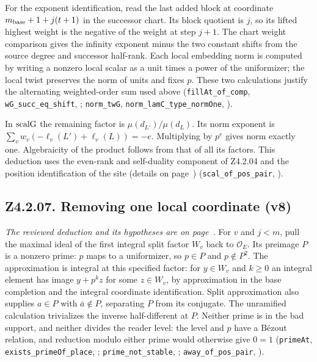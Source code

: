For the exponent identification, read the last added block at coordinate \(m_{\rm base}+1+j(t+1)\) in the successor chart. Its block quotient is \(j\), so its lifted highest weight is the negative of the weight at step \(j+1\). The chart weight comparison gives the infinity exponent minus the two constant shifts from the source degree and successor half-rank. Each local embedding norm is computed by writing a nonzero local scalar as a unit times a power of the uniformizer; the local twist preserves the norm of units and fixes \(p\). These two calculations justify the alternating weighted-order sum used above (\nolinkurl{fillAt_of_comp}, \nolinkurl{wG_succ_eq_shift}, ; \nolinkurl{norm_twG}, \nolinkurl{norm_lamC_type_normOne}, ).

In \({\rm scalG}\) the remaining factor is \(\mu(d_{L'})/\mu(d_L)\). Its norm exponent is \(\sum_v w_v(-\ell_v(L')+\ell_v(L))=-e\). Multiplying by \(p^e\) gives norm exactly one. Algebraicity of the product follows from that of all its factors. This deduction uses the even-rank and self-duality component of Z4.2.04 and the position identification of the site (details on page~\pageref{r7:review:Z4.2.08}) (\nolinkurl{scal_of_pos_pair}, ).

\subsection{Z4.2.07. Removing one local coordinate (v8)}\label{r6:Z4.2.07}
\emph{The reviewed deduction and its hypotheses are on page~\pageref{r8:Z4.2.07}.}
For \(v\) and \(j<m\), pull the maximal ideal of the first integral split factor \(W_v\) back to \(\mathcal O_E\). Its preimage \(P\) is a nonzero prime: \(p\) maps to a uniformizer, so \(p\in P\) and \(p\notin P^2\). The approximation is integral at this specified factor: for \(y\in W_v\) and \(k\ge0\) an integral element has image \(y+p^k z\) for some \(z\in W_v\), by approximation in the base completion and the integral coordinate identification. Split approximation also supplies \(a\in P\) with \(\bar a\notin P\), separating \(P\) from its conjugate. The unramified calculation trivializes the inverse half-different at \(P\). Neither prime is in the bad support, and neither divides the reader level: the level and \(p\) have a Bézout relation, and reduction modulo either prime would otherwise give \(0=1\)
(\nolinkurl{primeAt}, \nolinkurl{exists_primeOf_place}, ; \nolinkurl{prime_not_stable}, ; \nolinkurl{away_of_pos_pair}, ).


